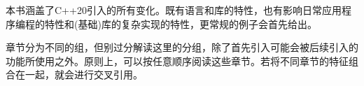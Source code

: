 本书涵盖了C++20引入的所有变化。既有语言和库的特性，也有影响日常应用程序编程的特性和(基础)库的复杂实现的特性，更常规的例子会首先给出。

章节分为不同的组，但别过分解读这里的分组，除了首先引入可能会被后续引入的功能所使用之外。原则上，可以按任意顺序阅读这些章节。若将不同章节的特征组合在一起，就会进行交叉引用。
